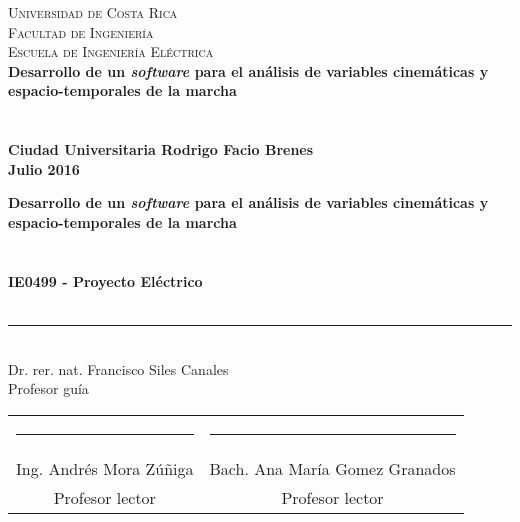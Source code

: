 \documentclass[11pt, letterpaper, twoside, openright]{book}
\begin{document}
\frontmatter
\pagestyle{plain}

\thispagestyle{empty}
\begin{center}
     \Large\textsc{Universidad de Costa Rica \\ Facultad de Ingeniería \\ Escuela de Ingeniería Eléctrica} \\
    \vspace{6cm}
    \LARGE\bfseries{Desarrollo de un \emph{software} para el análisis de variables cinemáticas y espacio-temporales de la marcha} \\
    \vspace{2cm}
    \large{} \\
    \vspace{0.5cm}
    \Large{} \\
    \vfill
    \large{Ciudad Universitaria Rodrigo Facio Brenes}\\
    \vspace{0.5cm}
    \large{Julio 2016}
\end{center}
\newpage\null\thispagestyle{empty}\newpage

\thispagestyle{empty}
\begin{center}
    \LARGE\bfseries{Desarrollo de un \emph{software} para el análisis de variables cinemáticas y espacio-temporales de la marcha} \\
    \vspace{2cm}
    \large{} \\
    \vspace{0.5cm}
    \Large{} \\
    \vfill
    \large\bfseries{IE0499 - Proyecto Eléctrico} \\
    \vspace{0.5cm}
    \large{} \\
    \vspace{4cm}
    \rule{6cm}{0.1pt}\\
    \normalfont\large{Dr. rer. nat. Francisco Siles Canales} \\
    \normalfont\large{Profesor guía} \\
    \vspace{2cm} 
    \begin{table}[!h]
        \centering
        \begin{tabular}{cc}
            \rule{6cm}{0.1pt}  & \rule{6cm}{0.1pt} \\
            Ing. Andrés Mora Zúñiga & Bach. Ana María Gomez Granados \\
            Profesor lector         & Profesor lector \\
        \end{tabular}
    \end{table}
\end{center}
\end{document}
